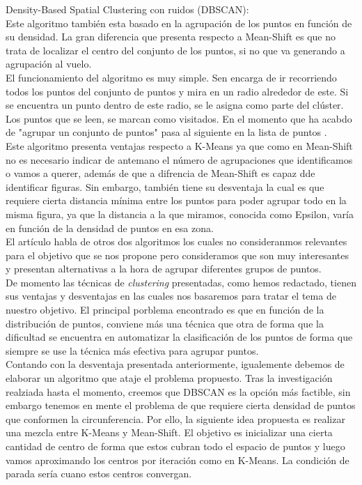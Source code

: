 \documentclass[conference,a4paper]{IEEEtran}
\begin{document}
Density-Based Spatial Clustering con ruidos (DBSCAN):\\

Este algoritmo también esta basado en la agrupación de los puntos en función de su densidad. La gran diferencia que presenta respecto a Mean-Shift es que no trata de localizar el centro del conjunto de los puntos, si no que va generando a agrupación al vuelo.\\

El funcionamiento del algoritmo es muy simple. Sen encarga de ir recorriendo todos los puntos del conjunto de puntos y mira en un radio alrededor de este. Si se encuentra un punto dentro de este radio, se le asigna como parte del clúster. Los puntos que se leen, se marcan como visitados. En el momento que ha acabdo de "agrupar un conjunto de puntos" pasa al siguiente en la lista de puntos .\\

Este algoritmo presenta ventajas respecto a K-Means ya que como en Mean-Shift no es necesario indicar de antemano el número de agrupaciones que identificamos o vamos a querer, además de  que a difrencia de Mean-Shift es capaz dde identificar figuras. Sin embargo, también tiene su desventaja la cual es que requiere cierta distancia mínima entre los puntos para poder agrupar todo en la misma figura, ya que la distancia a la que miramos, conocida como Epsilon, varía en función de la densidad de puntos en esa zona.\\

El artículo habla de otros dos algoritmos los cuales no consideranmos relevantes para el objetivo que se nos propone pero consideramos que son muy interesantes  y presentan alternativas a la hora de agrupar diferentes grupos de puntos.\\

De momento las técnicas de \textit{clustering} presentadas, como hemos redactado, tienen sus ventajas y desventajas en las cuales nos basaremos para tratar el tema de nuestro objetivo. El principal porblema encontrado es que en función de la distribución de puntos, conviene más una técnica que otra de forma que la dificultad se encuentra en automatizar la clasificación de los puntos de forma que siempre se use la técnica más efectiva para agrupar puntos.\\

Contando con la desventaja presentada anteriormente, igualemente debemos de elaborar un algoritmo que ataje el problema propuesto. Tras la investigación realziada hasta el momento, creemos que DBSCAN es la opción más factible, sin embargo tenemos en  mente el problema de que requiere cierta densidad de puntos que conformen la circunferencia. Por ello, la siguiente idea propuesta es realizar una mezcla entre K-Means y Mean-Shift. El objetivo es inicializar una cierta cantidad de centro de forma que estos cubran todo el espacio de puntos y luego vamos aproximando los centros por iteración como en K-Means. La condición de parada sería cuano estos centros convergan. \\
\end{document}
